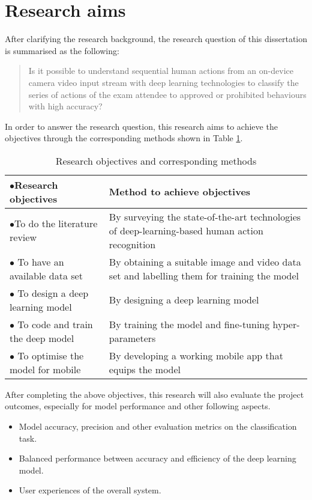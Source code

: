 \section{Research aims}
\label{sec:Research aims}
After clarifying the research background, the research question of this dissertation is summarised as the following:

\begin{quote}
    Is it possible to understand sequential human actions from an on-device camera video input stream with deep learning technologies to classify the series of actions of the exam attendee to approved or prohibited behaviours with high accuracy?
\end{quote}

In order to answer the research question, this research aims to achieve the objectives through the corresponding methods shown in Table \ref{tab:Research objectives}.

\begin{table}[!ht]
    \centering
    \begin{longtable}{>{\hspace*{-0.3cm}$\bullet$\hspace*{0.2cm}}p{}p{}}
\textbf{Research objectives} & \textbf{Method to achieve objectives} \\ \hline
To do the literature review & By surveying the state-of-the-art technologies of deep-learning-based human action recognition \\ \hline
To have an available data set & By obtaining a suitable image and video data set and labelling them for training the model \\ \hline
To design a deep learning model & By designing a deep learning model \\ \hline
To code and train the deep model & By training the model and fine-tuning hyper-parameters \\ \hline
To optimise the model for mobile & By developing a working mobile app that equips the model \\ 
\end{longtable}
    \caption{Research objectives and corresponding methods}
    \label{tab:Research objectives}
\end{table}

After completing the above objectives, this research will also evaluate the project outcomes, especially for model performance and other following aspects.

\begin{itemize}
    \item Model accuracy, precision and other evaluation metrics on the classification task.
    \item Balanced performance between accuracy and efficiency of the deep learning model.
    \item User experiences of the overall system.
\end{itemize}
